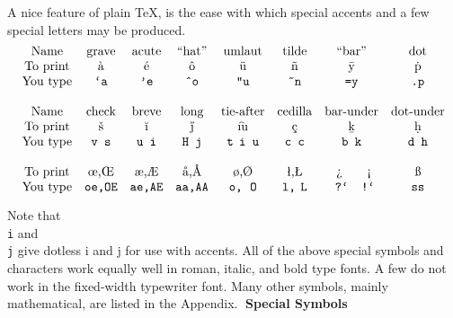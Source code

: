 A nice feature of plain \TeX, is the ease with
which special accents and a few special letters may be produced.
$$\vbox{\tabskip 1em plus 2em minus .5em
\halign{\hfil #\hfil &&\hfil #\hfil \cr
Name&grave&acute&``hat''&umlaut&tilde&``bar''&dot\cr
To print&\`a&\'e&\^o&\"u&\~n&\=y&\.p\cr
You type&{\tt \\`a}&{\tt \\'e}&{\tt \\\^{}o}&{\tt \\"u}&{\tt
\\\~{}n}&{\tt \\=y}&{\tt \\.p}\cr
\noalign{\bigskip}
Name&check&breve&long&tie-after&cedilla&bar-under&dot-under\cr
To print&\v s&\u\i&\H \j&\t\i u&\c c&\b k&\d h\cr
You type&{\tt \\v s}&{\tt \\u\\i}&{\tt \\H\\j}&{\tt \\t\\i u}&{\tt
\\c c}&{\tt \\b k}&{\tt \\d h}\cr
\noalign{\bigskip}
To print&\oe ,\OE&\ae ,\AE&\aa ,\AA&\o ,\O&\l ,\L&\ ?`\qquad !`&\ss\cr
You type&{\tt \\oe,\\OE}&{\tt \\ae,\\AE}&{\tt \\aa,\\AA}&{\tt
\\o,\\O}&{\tt \\l,\\L}&\tt\ ?{}`\quad !{}`&{\tt \\ss}\cr}}$$

Note that {\tt \\i} and {\tt \\j} give dotless i and j for use with accents.
All of the above
special symbols and characters work equally well in roman, italic,
and bold type fonts.
A few do not work in the fixed-width typewriter font.
Many other symbols, mainly mathematical, are listed in the Appendix.
{\bf Special Symbols}

